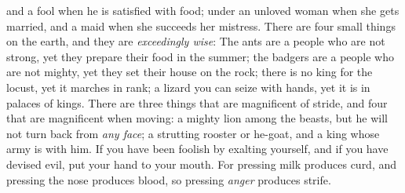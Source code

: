 \begin{biblechapter}
and a fool when he is satisfied with food;
\verse under an unloved woman when she gets married, 
and a maid when she succeeds her mistress.
\verse There are four small things on the earth, 
and they are \textit{exceedingly wise}:
\verse The ants are a people who are not strong, 
yet they prepare their food in the summer;
\verse the badgers are a people who are not mighty, 
yet they set their house on the rock;
\verse there is no king for the locust, 
yet it marches in rank;
\verse a lizard you can seize with hands, 
yet it is in palaces of kings.
\verse There are three things that are magnificent of stride, 
and four that are magnificent when moving:
\verse a mighty lion among the beasts, 
but he will not turn back from \textit{any face};
\verse a strutting rooster or he-goat, 
and a king whose army is with him.
\verse If you have been foolish by exalting yourself, 
and if you have devised evil, put your hand to your mouth.
\verse For pressing milk produces curd, 
and pressing the nose produces blood, 
so pressing \textit{anger} produces strife.
\end{biblechapter}

